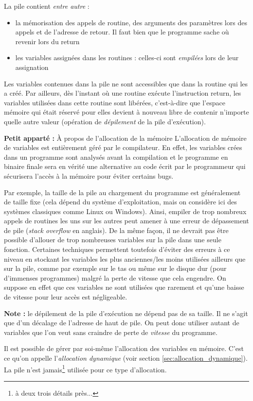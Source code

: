 \documentclass[../../../main.tex]{subfiles}
\begin{document}
La pile contient \textit{entre autre} :
\begin{itemize}
	\item la mémorisation des appels de routine, des arguments des paramètres lors des appels et de l'adresse de retour. Il faut bien que le programme sache où revenir lors du \textsf{return}
	\item les variables assignées dans les routines : celles-ci sont \textit{empilées} lors de leur assignation
\end{itemize}
Les variables contenues dans la pile ne sont accessibles que dans la routine qui les a créé. Par ailleurs, dès l'instant où une routine exécute l'instruction \textsf{return}, les variables utilisées dans cette routine sont libérées, c'est-à-dire que l'espace mémoire qui était réservé pour elles devient à nouveau libre de contenir n'importe quelle autre valeur (opération de \textit{dépilement} de la pile d'exécution).

\begin{minitelbasicbox}{\textbf{Petit apparté :} À propos de l'allocation de la mémoire}
	L'allocation de mémoire de variables est entièrement géré par le compilateur. En effet, les variables crées dans un programme sont analysés avant la compilation et le programme en binaire finale sera en vérité une alternative au code écrit par le programmeur qui sécurisera l'accès à la mémoire pour éviter certains bugs. \newline
 
	Par exemple, la taille de la pile au chargement du programme est généralement de taille fixe (cela dépend du système d'exploitation, mais on considère ici des systèmes classiques comme Linux ou Windows). Ainsi, empiler de trop nombreux appels de routines les uns sur les autres peut amener à une erreur de dépassement de pile (\textit{stack overflow} en anglais). De la même façon, il ne devrait pas être possible d'allouer de trop nombreuses variables sur la pile dans une seule fonction. Certaines techniques permettent toutefois d'éviter des erreurs à ce niveau en stockant les variables les plus anciennes/les moins utilisées ailleurs que sur la pile, comme par exemple sur le tas ou même sur le disque dur (pour d'immenses programmes) malgré la perte de vitesse que cela engendre. On suppose en effet que ces variables ne sont utilisées que rarement et qu'une baisse de vitesse pour leur accès est négligeable. \newline

	\textbf{Note :} le dépilement de la pile d'exécution ne dépend pas de sa taille. Il ne s'agit que d'un décalage de l'adresse de haut de pile. On peut donc utiliser autant de variables que l'on veut sans craindre de perte de \textit{vitesse} du programme. \newline

	Il est possible de gérer par soi-même l'allocation des variables en mémoire. C'est ce qu'on appelle l'\textit{allocation dynamique} (voir section \ref{sec:allocation_dynamique}). La pile n'est jamais\footnote{à deux trois détails près...} utilisée pour ce type d'allocation.
\end{minitelbasicbox}
\end{document}
